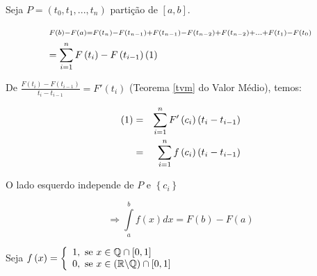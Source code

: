 \documentclass{book}
\begin{document}
\begin{dem}
    Seja $P = \left( {t_0 ,t_1 ,...,t_n } \right)$ parti\c c\~ao de $\left[ {a,b} \right]$.

\[
\begin{gathered}
  \scriptstyle {F\left( b \right) - F\left( a \right) = F\left( {t_n } \right) - F\left( {t_{n - 1} } \right) + F\left( {t_{n - 1} } \right) - F\left( {t_{n - 2} } \right) + F\left( {t_{n - 2} } \right) + ... + F\left( {t_1 } \right) - F\left( {t_0 } \right)} \hfill \\
   = \sum\limits_{i = 1}^n {F\left( {t_i } \right) - F\left( {t_{i - 1} } \right)} \left( 1 \right) \hfill \\
\end{gathered}
\]

    De $\displaystyle \frac{{F\left( {t_i } \right) - F\left( {t_{i - 1} } \right)}}
{{t_i  - t_{i - 1} }} = F'\left( {t_i } \right)$ (Teorema \ref{tvm} do Valor M\'edio), temos:

\begin{eqnarray*}
      \left( 1 \right) &=& \sum\limits_{i = 1}^n {F'\left( {c_i } \right)\left( {t_i  - t_{i - 1} } \right)}  \hfill \\
       &=& \sum\limits_{i = 1}^n {f\left( {c_i } \right)\left( {t_i  - t_{i - 1} } \right)}  \hfill \\
\end{eqnarray*}

O lado esquerdo independe de $P$ e $\left\{ {c_i } \right\}$

\[
     \Rightarrow \int\limits_a^b {f\left( x \right)dx}  = F\left( b \right) - F\left( a \right)
\]

\end{dem}

\begin{ex}

Seja $f\left( x \right) = \left\{ {\begin{array}{l}
1,\mbox{ se }x \in \mathbb{Q} \cap \left[ {0,1} \right] \\
0,\mbox{ se }x \in \left( {\mathbb{R}\backslash \mathbb{Q}} \right) \cap
\left[ {0,1} \right] \\
\end{array}} \right.$

\end{ex}
\end{document}
